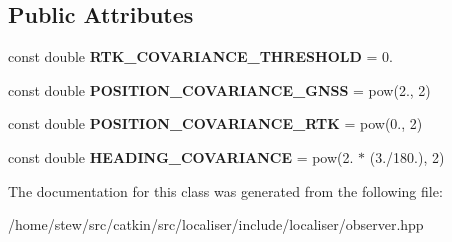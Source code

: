 \subsection*{Public Attributes}
\begin{DoxyCompactItemize}
\item 
\mbox{\label{classGNSSObservation_a40403a43f71cb41d34964ad7b5312e83}} 
const double {\bfseries R\+T\+K\+\_\+\+C\+O\+V\+A\+R\+I\+A\+N\+C\+E\+\_\+\+T\+H\+R\+E\+S\+H\+O\+LD} = 0.
\item 
\mbox{\label{classGNSSObservation_a565aa2d16a03d46821af8dfb270e6b09}} 
const double {\bfseries P\+O\+S\+I\+T\+I\+O\+N\+\_\+\+C\+O\+V\+A\+R\+I\+A\+N\+C\+E\+\_\+\+G\+N\+SS} = pow(2., 2)
\item 
\mbox{\label{classGNSSObservation_a2e7aa6fd27ee685def43309596899da9}} 
const double {\bfseries P\+O\+S\+I\+T\+I\+O\+N\+\_\+\+C\+O\+V\+A\+R\+I\+A\+N\+C\+E\+\_\+\+R\+TK} = pow(0., 2)
\item 
\mbox{\label{classGNSSObservation_af2032110626cec0239c5920e65e68ccc}} 
const double {\bfseries H\+E\+A\+D\+I\+N\+G\+\_\+\+C\+O\+V\+A\+R\+I\+A\+N\+CE} = pow(2. $\ast$ (3./180.), 2)
\end{DoxyCompactItemize}


The documentation for this class was generated from the following file\+:\begin{DoxyCompactItemize}
\item 
/home/stew/src/catkin/src/localiser/include/localiser/observer.\+hpp\end{DoxyCompactItemize}
